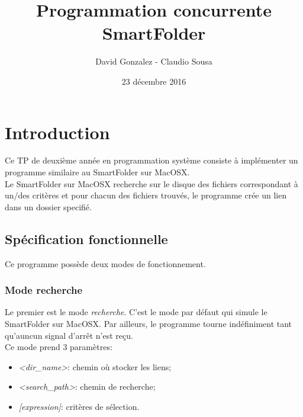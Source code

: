 \documentclass[11pt, a4paper]{article}
\begin{document}
\title
{
    \Huge{Programmation concurrente} \\
    \Huge{SmartFolder}
}
\author
{
    \LARGE{David Gonzalez - Claudio Sousa}
}
\date{23 décembre 2016}
\maketitle

\begin{center}
\end{center}

\thispagestyle{empty}

\newpage

\section{Introduction}

Ce TP de deuxième année en programmation système consiste à implémenter un programme similaire au SmartFolder sur MacOSX. \\

Le SmartFolder sur MacOSX recherche sur le disque des fichiers correspondant à un/des critères et
pour chacun des fichiers trouvés, le programme crée un lien dans un dossier specifié.

\subsection{Spécification fonctionnelle}
Ce programme possède deux modes de fonctionnement.

\subsubsection{Mode recherche}
Le premier est le mode \textit{recherche}.
C'est le mode par défaut qui simule le SmartFolder sur MacOSX.
Par ailleurs, le programme tourne indéfiniment tant qu'auncun signal d'arrêt n'est reçu. \\

Ce mode prend 3 paramètres:
\begin{itemize}
    \item \textit{<dir\_name>}: chemin où stocker les liens;
    \item \textit{<search\_path>}: chemin de recherche;
    \item \textit{[expression]}: critères de sélection. \\
\end{itemize}
\end{document}
